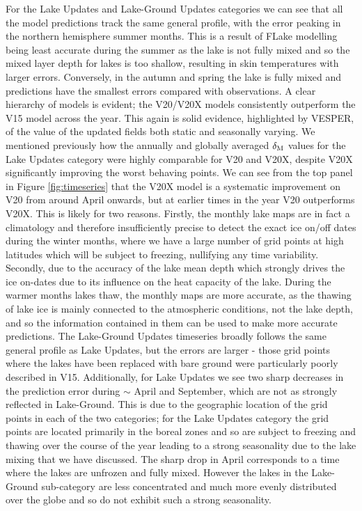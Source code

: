 \documentclass[twocolumn]{article}
\begin{document}
	\noindent For the Lake Updates and Lake-Ground Updates categories we can see that all the model predictions track the same general profile, with the error peaking in the northern hemisphere summer months. This is a result of FLake modelling being least accurate during the summer as the lake is not fully mixed and so the mixed layer depth for lakes is too shallow, resulting in skin temperatures with larger errors. Conversely, in the autumn and spring the lake is fully mixed and predictions have the smallest errors compared with observations. A clear hierarchy of models is evident; the V20/V20X models consistently outperform the V15 model across the year. This again is solid evidence, highlighted by VESPER, of the value of the updated fields both static and seasonally varying. We mentioned previously how the annually and globally averaged $\delta_{\rm M}$ values for the Lake Updates category were highly comparable for V20 and V20X, despite V20X significantly improving the worst behaving points. We can see from the top panel in Figure \ref{fig:timeseries} that the V20X model is a systematic improvement on V20 from around April onwards, but at earlier times in the year V20 outperforms V20X. This is likely for two reasons. Firstly, the monthly lake maps are in fact a climatology and therefore insufficiently precise to detect the exact ice on/off dates during the winter months, where we have a large number of grid points at high latitudes which will be subject to freezing, nullifying any time variability. Secondly, due to the accuracy of the lake mean depth which strongly drives the ice on-dates due to its influence on the heat capacity of the lake. During the warmer months lakes thaw, the monthly maps are more accurate, as the thawing of lake ice is mainly connected to the atmospheric conditions, not the lake depth, and so the information contained in them can be used to make more accurate predictions. The Lake-Ground Updates timeseries broadly follows the same general profile as Lake Updates, but the errors are larger - those grid points where the lakes have been replaced with bare ground were particularly poorly described in V15. Additionally, for Lake Updates we see two sharp decreases in the prediction error during $\sim$ April and September, which are not as strongly reflected in Lake-Ground. This is due to the geographic location of the grid points in each of the two categories; for the Lake Updates category the grid points are located primarily in the boreal zones and so are subject to freezing and thawing over the course of the year leading to a strong seasonality due to the lake mixing that we have discussed. The sharp drop in April corresponds to a time where the lakes are unfrozen and fully mixed. However the lakes in the Lake-Ground sub-category are less concentrated and much more evenly distributed over the globe and so do not exhibit such a strong seasonality. \newline 
	
\end{document}
